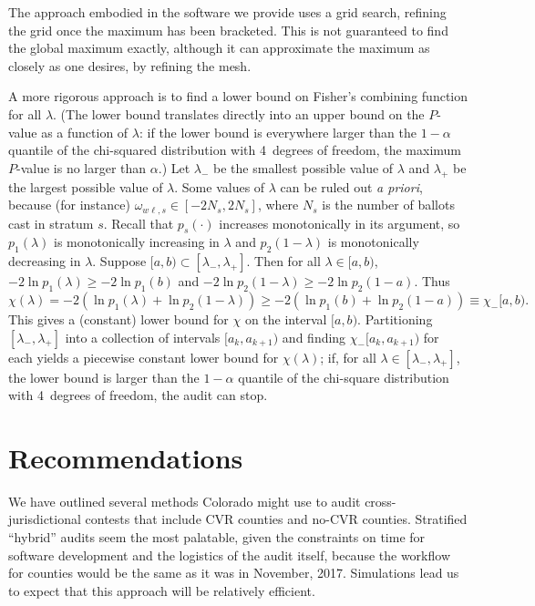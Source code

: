 \documentclass[runningheads]{llncs}
\newcommand{\beq}{\begin{equation}}
\newcommand{\eeq}{\end{equation}}
\begin{document}
The approach embodied in the software we provide uses a grid search, refining the
grid once the maximum has been bracketed.
This is not guaranteed to find the global maximum exactly, although it can approximate 
the maximum as closely as one desires, by refining the mesh.

A more rigorous approach is to find a lower bound on Fisher's combining function for all
$\lambda$. 
(The lower bound translates directly into an upper bound on the $P$-value as a function of
$\lambda$: if the lower bound is 
everywhere larger than the $1-\alpha$ quantile of the chi-squared distribution with 4~degrees of freedom, the maximum $P$-value is no larger than $\alpha$.)
Let $\lambda_-$ be the smallest possible value of $\lambda$ and $\lambda_+$ be the largest
possible value of $\lambda$.
Some values of $\lambda$ can be ruled out \emph{a priori}, because (for instance) $\omega_{w\ell,s} \in [-2N_s, 2N_s]$,
where $N_s$ is the number of ballots cast in stratum $s$.
Recall that $p_s(\cdot)$ increases monotonically in its argument, so $p_1(\lambda)$ is
monotonically increasing in $\lambda$ and $p_2(1-\lambda)$ is monotonically decreasing in $\lambda$.
Suppose $[a, b) \subset [\lambda_-, \lambda_+]$.
Then for all $\lambda \in [a, b)$, $-2\ln p_1(\lambda) \ge -2\ln p_1(b)$ and
$-2\ln p_2(1-\lambda) \ge -2\ln p_2(1-a)$.
Thus
\beq
   \chi(\lambda) = -2(\ln p_1(\lambda)+ \ln p_2(1-\lambda))
          \ge -2(\ln p_1(b) + \ln p_2(1-a)) \equiv \chi_-[a,b).
\eeq
This gives a (constant) lower bound for $\chi$ on the interval $[a, b)$.
Partitioning $[\lambda_-, \lambda_+]$ into a collection of intervals $[a_k, a_{k+1})$
and finding $\chi_-[a_k, a_{k+1})$ for each
yields a piecewise constant lower bound for $\chi(\lambda)$; if,
 for all $\lambda \in [\lambda_-, \lambda_+]$, the lower bound
is larger than the $1-\alpha$ quantile of the chi-square distribution with 4~degrees of freedom,
the audit can stop.

%



\section{Recommendations} \label{sec:recommendations}

We have outlined several methods Colorado might use to audit cross-jurisdictional contests
that include CVR counties and no-CVR counties.
Stratified ``hybrid'' audits seem the most palatable,
given the constraints on time for software development and the logistics
of the audit itself, because the workflow for counties would be the same
as it was in November, 2017.
Simulations lead us to expect that this approach will be relatively efficient.
\end{document}
